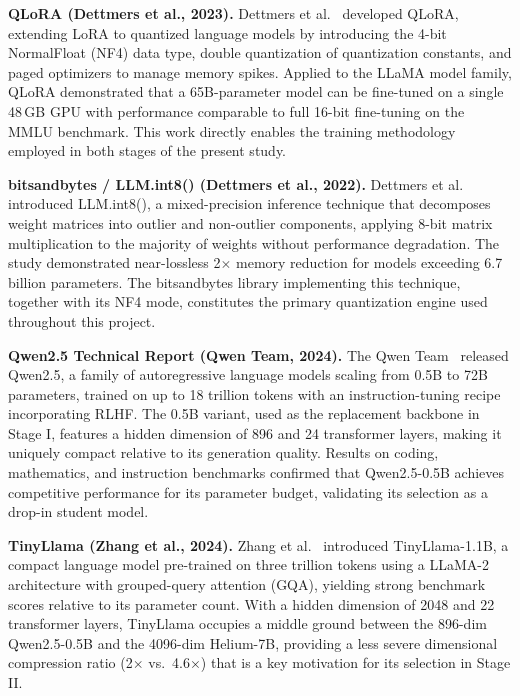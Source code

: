 \documentclass[conference]{IEEEtran}
\begin{document}
\textbf{QLoRA (Dettmers et al., 2023).}
Dettmers et al.~\cite{dettmers2023qlora} developed QLoRA, extending LoRA to
quantized language models by introducing the 4-bit NormalFloat (NF4) data type,
double quantization of quantization constants, and paged optimizers to manage
memory spikes.
Applied to the LLaMA model family, QLoRA demonstrated that a 65B-parameter model
can be fine-tuned on a single 48\,GB GPU with performance comparable to full
16-bit fine-tuning on the MMLU benchmark.
This work directly enables the training methodology employed in both stages of
the present study.

\textbf{bitsandbytes / LLM.int8() (Dettmers et al., 2022).}
Dettmers et al.~\cite{dettmers2022llmint8} introduced LLM.int8(), a mixed-precision
inference technique that decomposes weight matrices into outlier and non-outlier
components, applying 8-bit matrix multiplication to the majority of weights
without performance degradation.
The study demonstrated near-lossless 2$\times$ memory reduction for models
exceeding 6.7 billion parameters.
The bitsandbytes library implementing this technique, together with its NF4 mode,
constitutes the primary quantization engine used throughout this project.

\textbf{Qwen2.5 Technical Report (Qwen Team, 2024).}
The Qwen Team~\cite{qwen2025} released Qwen2.5, a family of autoregressive
language models scaling from 0.5B to 72B parameters, trained on up to 18 trillion
tokens with an instruction-tuning recipe incorporating RLHF.
The 0.5B variant, used as the replacement backbone in Stage I, features
a hidden dimension of 896 and 24 transformer layers, making it uniquely
compact relative to its generation quality.
Results on coding, mathematics, and instruction benchmarks confirmed that
Qwen2.5-0.5B achieves competitive performance for its parameter budget, validating
its selection as a drop-in student model.

\textbf{TinyLlama (Zhang et al., 2024).}
Zhang et al.~\cite{zhang2024tinyllama} introduced TinyLlama-1.1B, a compact
language model pre-trained on three trillion tokens using a LLaMA-2 architecture
with grouped-query attention (GQA), yielding strong benchmark scores relative to
its parameter count.
With a hidden dimension of 2048 and 22 transformer layers, TinyLlama occupies
a middle ground between the 896-dim Qwen2.5-0.5B and the 4096-dim Helium-7B,
providing a less severe dimensional compression ratio (2$\times$ vs.\ 4.6$\times$)
that is a key motivation for its selection in Stage II.
\end{document}
